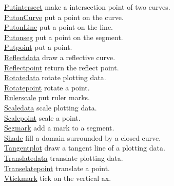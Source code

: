 \documentclass[papersize,a4paper,12pt]{article}
\begin{document}
\begin{tabbing}
\hyperlink{putintersect}{Putintersect} \> make a intersection point of two curves.\\
\hyperlink{putoncurve}{PutonCurve} \> put a point on the curve.\\
\hyperlink{putonline}{PutonLine} \> put a point on the line.\\
\hyperlink{putonSeg}{Putonseg} \> put a point on the segment.\\
\hyperlink{putpoint}{Putpoint} \> put a point.\\
\hyperlink{reflectdata}{Reflectdata} \> draw a reflective curve.\\
\hyperlink{reflectpoint}{Reflectpoint} \> return the reflect point.\\
\hyperlink{rotatedata}{Rotatedata} \> rotate plotting data.\\
\hyperlink{rotatepoint}{Rotatepoint} \> rotate a point.\\
\hyperlink{rulerscale}{Rulerscale} \> put ruler marks.\\
\hyperlink{scaledata}{Scaledata} \> scale plotting data.\\
\hyperlink{scalepoint}{Scalepoint} \> scale a point.\\
\hyperlink{segmark}{Segmark} \> add a mark to a segment.\\
\hyperlink{shade}{Shade} \> fill a domain surrounded by a closed curve.\\
\hyperlink{tangentplot}{Tangentplot} \> draw a tangent line of a plotting data.\\
\hyperlink{translatedata}{Translatedata} \> translate plotting data.\\
\hyperlink{translatepoint}{Transelatepoint} \> translate a point.\\
\hyperlink{vtickmark}{Vtickmark} \> tick on the vertical ax.\\


\end{tabbing}
\end{document}
